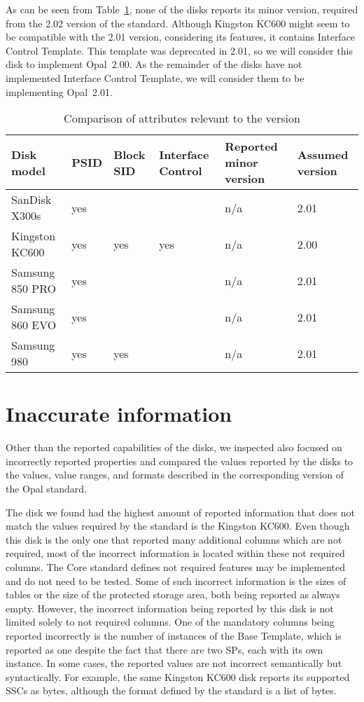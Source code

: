 As can be seen from Table~\ref{table:compare_versions}, none of the disks reports its minor version, required from the 2.02 version of the standard.
Although Kingston KC600 might seem to be compatible with the 2.01 version, considering its features, it contains Interface Control Template. This template was deprecated in 2.01, so we will consider this disk to implement Opal~2.00.
As the remainder of the disks have not implemented Interface Control Template, we will consider them to be implementing Opal~2.01.


\begin{table}
\small
\begin{tabularx}{\textwidth}{lXXXXX}
\toprule
  Disk model & PSID & Block SID & Interface Control & Reported minor version & Assumed version \\
\midrule
SanDisk X300s       & yes &     &     & n/a & 2.01       \\
Kingston KC600      & yes & yes & yes & n/a & 2.00       \\
Samsung 850 PRO     & yes &     &     & n/a & 2.01       \\
Samsung 860 EVO     & yes &     &     & n/a & 2.01       \\
Samsung 980         & yes & yes &     & n/a & 2.01       \\ 
\bottomrule
\end{tabularx}
\caption{Comparison of attributes relevant to the version}
\label{table:compare_versions}
\end{table}

\section{Inaccurate information}

Other than the reported capabilities of the disks, we inspected also focused on incorrectly reported properties and compared the values reported by the disks to the values, value ranges, and formats described in the corresponding version of the Opal standard. 

The disk we found had the highest amount of reported information that does not match the values required by the standard is the Kingston KC600. 
Even though this disk is the only one that reported many additional columns which are not required, most of the incorrect information is located within these not required columns.
The Core standard defines not required features may be implemented and do not need to be tested.
Some of such incorrect information is the sizes of tables or the size of the protected storage area, both being reported as always empty.
However, the incorrect information being reported by this disk is not limited solely to not required columns. One of the mandatory columns being reported incorrectly is the number of instances of the Base Template, which is reported as one despite the fact that there are two SPs, each with its own instance. 
In some cases, the reported values are not incorrect semantically but syntactically. For example, the same Kingston KC600 disk reports its supported SSCs as bytes, although the format defined by the standard is a list of bytes.

